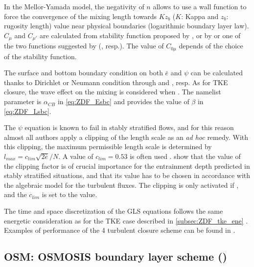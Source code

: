 \documentclass[../tex_main/NEMO_manual]{subfiles}
\begin{document}
In the Mellor-Yamada model, the negativity of $n$ allows to use a wall function to force the convergence of
the mixing length towards $K z_b$ ($K$: Kappa and $z_b$: rugosity length) value near physical boundaries
(logarithmic boundary layer law).
$C_{\mu}$ and $C_{\mu'}$ are calculated from stability function proposed by \citet{Galperin_al_JAS88},
or by \citet{Kantha_Clayson_1994} or one of the two functions suggested by \citet{Canuto_2001}
(, resp.). 
The value of $C_{0\mu}$ depends of the choice of the stability function.

The surface and bottom boundary condition on both $\bar{e}$ and $\psi$ can be calculated thanks to Dirichlet or
Neumann condition through  and , resp.
As for TKE closure, the wave effect on the mixing is considered when
 \citep{Craig_Banner_JPO94, Mellor_Blumberg_JPO04}.
The  namelist parameter is $\alpha_{CB}$ in \autoref{eq:ZDF_Esbc} and
 provides the value of $\beta$ in \autoref{eq:ZDF_Lsbc}. 

The $\psi$ equation is known to fail in stably stratified flows, and for this reason
almost all authors apply a clipping of the length scale as an \textit{ad hoc} remedy.
With this clipping, the maximum permissible length scale is determined by $l_{max} = c_{lim} \sqrt{2\bar{e}}/ N$.
A value of $c_{lim} = 0.53$ is often used \citep{Galperin_al_JAS88}.
\cite{Umlauf_Burchard_CSR05} show that the value of the clipping factor is of crucial importance for
the entrainment depth predicted in stably stratified situations,
and that its value has to be chosen in accordance with the algebraic model for the turbulent fluxes.
The clipping is only activated if ,
and the $c_{lim}$ is set to the  value.

The time and space discretization of the GLS equations follows the same energetic consideration as for
the TKE case described in \autoref{subsec:ZDF_tke_ene} \citep{Burchard_OM02}.
Examples of performance of the 4 turbulent closure scheme can be found in \citet{Warner_al_OM05}.

\subsection{OSM: OSMOSIS boundary layer scheme (\protect{})}
\label{subsec:ZDF_osm}
\end{document}
